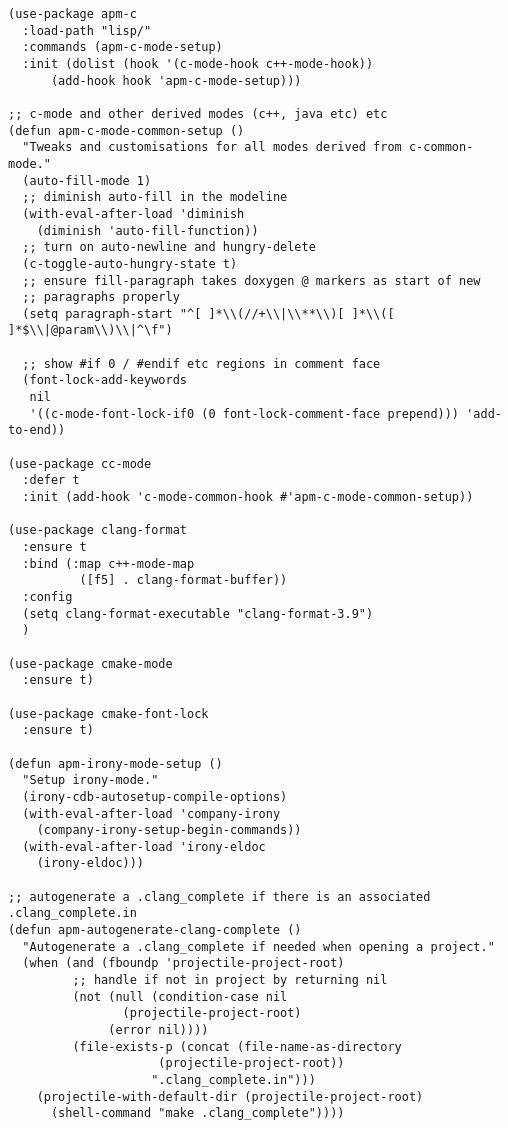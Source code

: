 \documentclass[11pt]{article}
\begin{document}
\begin{verbatim}
(use-package apm-c
  :load-path "lisp/"
  :commands (apm-c-mode-setup)
  :init (dolist (hook '(c-mode-hook c++-mode-hook))
	  (add-hook hook 'apm-c-mode-setup)))

;; c-mode and other derived modes (c++, java etc) etc
(defun apm-c-mode-common-setup ()
  "Tweaks and customisations for all modes derived from c-common-mode."
  (auto-fill-mode 1)
  ;; diminish auto-fill in the modeline
  (with-eval-after-load 'diminish
    (diminish 'auto-fill-function))
  ;; turn on auto-newline and hungry-delete
  (c-toggle-auto-hungry-state t)
  ;; ensure fill-paragraph takes doxygen @ markers as start of new
  ;; paragraphs properly
  (setq paragraph-start "^[ ]*\\(//+\\|\\**\\)[ ]*\\([ ]*$\\|@param\\)\\|^\f")

  ;; show #if 0 / #endif etc regions in comment face
  (font-lock-add-keywords
   nil
   '((c-mode-font-lock-if0 (0 font-lock-comment-face prepend))) 'add-to-end))

(use-package cc-mode
  :defer t
  :init (add-hook 'c-mode-common-hook #'apm-c-mode-common-setup))

(use-package clang-format
  :ensure t
  :bind (:map c++-mode-map
	      ([f5] . clang-format-buffer))
  :config
  (setq clang-format-executable "clang-format-3.9")
  )

(use-package cmake-mode
  :ensure t)

(use-package cmake-font-lock
  :ensure t)

(defun apm-irony-mode-setup ()
  "Setup irony-mode."
  (irony-cdb-autosetup-compile-options)
  (with-eval-after-load 'company-irony
    (company-irony-setup-begin-commands))
  (with-eval-after-load 'irony-eldoc
    (irony-eldoc)))

;; autogenerate a .clang_complete if there is an associated .clang_complete.in
(defun apm-autogenerate-clang-complete ()
  "Autogenerate a .clang_complete if needed when opening a project."
  (when (and (fboundp 'projectile-project-root)
	     ;; handle if not in project by returning nil
	     (not (null (condition-case nil
			    (projectile-project-root)
			  (error nil))))
	     (file-exists-p (concat (file-name-as-directory
				     (projectile-project-root))
				    ".clang_complete.in")))
    (projectile-with-default-dir (projectile-project-root)
      (shell-command "make .clang_complete"))))


\end{verbatim}
\end{document}
